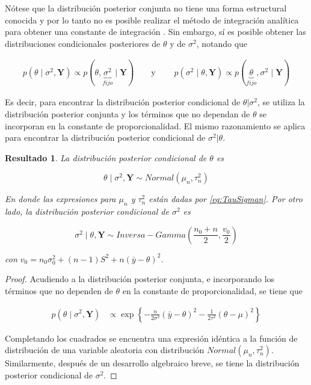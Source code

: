 \documentclass[
  10pt,
  spanish,
]{book}
\newtheorem{proposition}{Resultado}[chapter]
\theoremstyle{definition}
\theoremstyle{definition}
\theoremstyle{definition}
\theoremstyle{definition}
\theoremstyle{remark}
\begin{document}
Nótese que la distribución posterior conjunta no tiene una forma estructural conocida y por lo tanto no es posible realizar el método de integración analítica para obtener una constante de integración \citep{Migon}. Sin embargo, sí es posible obtener las distribuciones condicionales posteriores de \(\theta\) y de \(\sigma^2\), notando que

\begin{align*}
p(\theta \mid \sigma^2,\mathbf{Y})\propto p(\theta,\underbrace{\sigma^2}_{fijo} \mid \mathbf{Y})
\ \ \ \ \ \ \ \ \ \text{y} \ \ \ \ \ \ \ \ \ \
p(\sigma^2 \mid \theta,\mathbf{Y})\propto p(\underbrace{\theta}_{fijo},\sigma^2 \mid \mathbf{Y})
\end{align*}

Es decir, para encontrar la distribución posterior condicional de \(\theta | \sigma^2\), se utiliza la distribución posterior conjunta y los términos que no dependan de \(\theta\) se incorporan en la constante de proporcionalidad. El mismo razonamiento se aplica para encontrar la distribución posterior condicional de \(\sigma^2 | \theta\).

\begin{proposition}
\protect\hypertarget{prp:unnamed-chunk-3}{}{\label{prp:unnamed-chunk-3} }La distribución posterior condicional de \(\theta\) es

\begin{equation}
\label{eq:PostThetaGibbs}
\theta  \mid  \sigma^2,\mathbf{Y} \sim Normal(\mu_n,\tau_n^2)
\end{equation}

En donde las expresiones para \(\mu_n\) y \(\tau_n^2\) están dadas por \eqref{eq:TauSigman}. Por otro lado, la distribución posterior condicional de \(\sigma^2\) es

\begin{equation}
\label{eq:PostSigma2Gibbs}
\sigma^2  \mid  \theta,\mathbf{Y} \sim Inversa-Gamma\left(\dfrac{n_0+n}{2},\dfrac{v_0}{2}\right)
\end{equation}

con \(v_0=n_0\sigma^2_0+(n-1)S^2+n(\bar{y}-\theta)^2\).
\end{proposition}

\begin{proof}
{}Acudiendo a la distribución posterior conjunta, e incorporando los términos que no dependen de \(\theta\) en la constante de proporcionalidad, se tiene que

\begin{align*}
p(\theta \mid \sigma^2,\mathbf{Y})&\propto \exp\left\{-\frac{n}{2\sigma^2}(\bar{y}-\theta)^2-\frac{1}{2\tau^2}(\theta-\mu)^2\right\}
\end{align*}

Completando los cuadrados se encuentra una expresión idéntica a la función de distribución de una variable aleatoria con distribución \(Normal(\mu_n, \tau^2_n)\). Similarmente, después de un desarrollo algebraico breve, se tiene la distribución posterior condicional de \(\sigma^2\).
\end{proof}
\end{document}
